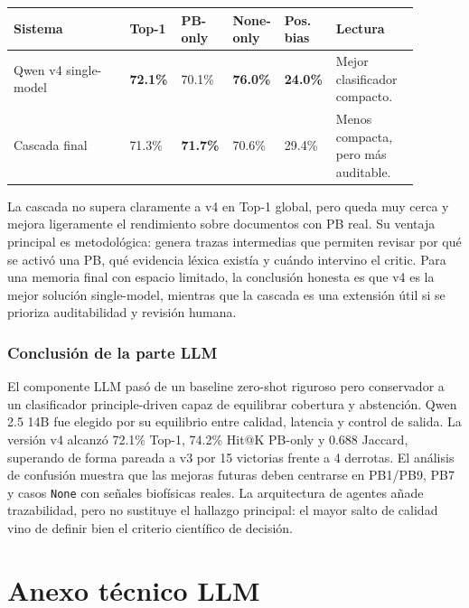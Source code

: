 \begin{center}
\scriptsize
\setlength{\tabcolsep}{4pt}
\renewcommand{\arraystretch}{1.15}
\begin{tabular}{p{0.29\linewidth}p{0.10\linewidth}p{0.10\linewidth}p{0.10\linewidth}p{0.10\linewidth}p{0.20\linewidth}}
\toprule
Sistema & Top-1 & PB-only & None-only & Pos. bias & Lectura \\
\midrule
Qwen v4 single-model & \textbf{72.1\%} & 70.1\% & \textbf{76.0\%} & \textbf{24.0\%} & Mejor clasificador compacto. \\
Cascada final & 71.3\% & \textbf{71.7\%} & 70.6\% & 29.4\% & Menos compacta, pero más auditable. \\
\bottomrule
\end{tabular}
\end{center}

La cascada no supera claramente a v4 en Top-1 global, pero queda muy cerca y mejora ligeramente el rendimiento sobre documentos con PB real. Su ventaja principal es metodológica: genera trazas intermedias que permiten revisar por qué se activó una PB, qué evidencia léxica existía y cuándo intervino el critic. Para una memoria final con espacio limitado, la conclusión honesta es que v4 es la mejor solución single-model, mientras que la cascada es una extensión útil si se prioriza auditabilidad y revisión humana.

\subsubsection{Conclusión de la parte LLM}

El componente LLM pasó de un baseline zero-shot riguroso pero conservador a un clasificador principle-driven capaz de equilibrar cobertura y abstención. Qwen 2.5 14B fue elegido por su equilibrio entre calidad, latencia y control de salida. La versión v4 alcanzó 72.1\% Top-1, 74.2\% Hit@K PB-only y 0.688 Jaccard, superando de forma pareada a v3 por 15 victorias frente a 4 derrotas. El análisis de confusión muestra que las mejoras futuras deben centrarse en PB1/PB9, PB7 y casos \texttt{None} con señales biofísicas reales. La arquitectura de agentes añade trazabilidad, pero no sustituye el hallazgo principal: el mayor salto de calidad vino de definir bien el criterio científico de decisión.

\clearpage
\section*{Anexo técnico LLM}

